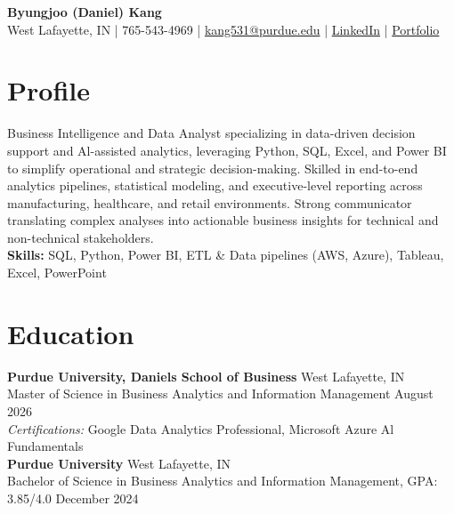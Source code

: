 \documentclass[11pt,a4paper]{article}
\begin{document}
\pagestyle{empty}

\begin{center}
    {\Huge \textbf{Byungjoo (Daniel) Kang}} \\ [4pt]
    West Lafayette, IN | 765-543-4969 | \href{mailto:kang531@purdue.edu}{kang531@purdue.edu} |
    \href{https://www.linkedin.com/in/daniel-byungjoo-kang/}{LinkedIn} | \href{https://daniel-kang-vs.github.io}{Portfolio}
\end{center}

\section*{Profile}  
Business Intelligence and Data Analyst specializing in data-driven decision support and Al-assisted analytics, leveraging Python, SQL, Excel, and Power BI to simplify operational and strategic decision-making.   Skilled in end-to-end analytics pipelines, statistical modeling, and executive-level reporting across manufacturing, healthcare, and retail environments.   Strong communicator translating complex analyses into actionable business insights for technical and non-technical stakeholders.  \\[4pt]
\textbf{Skills:} SQL, Python, Power BI, ETL \& Data pipelines (AWS, Azure), Tableau, Excel, PowerPoint  

\section*{Education}  
\noindent
\textbf{Purdue University, Daniels School of Business} \hfill West Lafayette, IN   \\
Master of Science in Business Analytics and Information Management \hfill August 2026   \\
\textit{Certifications:} Google Data Analytics Professional, Microsoft Azure Al Fundamentals   \\[6pt]
\textbf{Purdue University} \hfill West Lafayette, IN   \\
Bachelor of Science in Business Analytics and Information Management, GPA: 3.85/4.0 \hfill December 2024  

\end{document}
